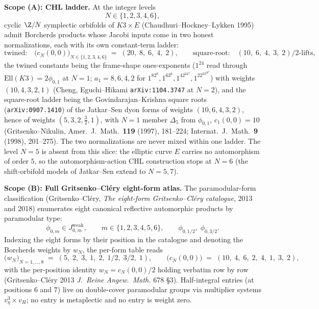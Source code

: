 \textbf{Scope (A): CHL ladder.} At the integer levels
\[
 N \in \{1, 2, 3, 4, 6\},
\]
cyclic $\Z/N$ symplectic orbifolds of $K3 \times E$ (Chaudhuri--Hockney--Lykken 1995) admit Borcherds products whose Jacobi inputs come in two honest normalizations, each with its own constant-term ladder:
\begin{equation}
 \text{twined:}\quad
 \bigl(c_N(0, 0)\bigr)_{N \in \{1, 2, 3, 4, 6\}} \;=\; (20, \; 8, \; 6, \; 4, \; 2),
 \qquad
 \text{square-root:}\quad
 (10, \; 6, \; 4, \; 3, \; 2)/2\text{-lifts},
 \label{eq:cn-zero-chl}
\end{equation}
the twined constants being the frame-shape ones-exponents ($1^{24}$ read through $\mathrm{Ell}(K3) = 2\phi_{0,1}$ at $N = 1$; $a_1 = 8, 6, 4, 2$ for $1^82^8, 1^63^6, 1^42^24^4, 1^22^23^26^2$) with weights $(10, 4, 3, 2, 1)$ (Cheng, Eguchi--Hikami \texttt{arXiv:1104.3747} at $N = 2$), and the square-root ladder being the Govindarajan--Krishna square roots (\texttt{arXiv:0907.1410}) of the Jatkar--Sen dyon forms of weights $(10, 6, 4, 3, 2)$, hence of weights $(5, 3, 2, \tfrac32, 1)$, with $N = 1$ member $\Delta_5$ from $\phi_{0,1}$, $c_1(0,0) = 10$ (Gritsenko--Nikulin, Amer.~J.~Math.~\textbf{119} (1997), 181--224; Internat.~J.~Math.~\textbf{9} (1998), 201--275). The two normalizations are never mixed within one ladder. The level $N = 5$ is absent from this slice: the elliptic curve $E$ carries no automorphism of order $5$, so the automorphism-action CHL construction stops at $N = 6$ (the shift-orbifold models of Jatkar--Sen extend to $N = 5, 7$).

\textbf{Scope (B): Full Gritsenko--Cl\'ery eight-form atlas.} The paramodular-form classification (Gritsenko--Cl\'ery, \emph{The eight-form Gritsenko--Cl\'ery catalogue}, 2013 and 2018) enumerates eight canonical reflective automorphic products by paramodular type:
\[
 \phi_{0, m} \in J_{0, m}^{\mathrm{weak}}, \qquad m \in \{1, 2, 3, 4, 5, 6\}, \qquad \phi_{0, 1/2}, \; \phi_{0, 3/2}.
\]
Indexing the eight forms by their position in the catalogue and denoting the Borcherds weights by $w_N$, the per-form table reads
\begin{equation}
 \bigl(w_N\bigr)_{N = 1, \ldots, 8} \;=\; (5, \; 2, \; 3, \; 1, \; 2, \; 1/2, \; 3/2, \; 1), \qquad \bigl(c_N(0, 0)\bigr) \;=\; (10, \; 4, \; 6, \; 2, \; 4, \; 1, \; 3, \; 2),
 \label{eq:cn-zero-gc-atlas}
\end{equation}
with the per-position identity $w_N = c_N(0, 0)/2$ holding verbatim row by row (Gritsenko--Cl\'ery 2013 \emph{J.\ Reine Angew.\ Math.} 678 \S 3). Half-integral entries (at positions $6$ and $7$) live on double-cover paramodular groups via multiplier systems $v_\eta^3 \times v_H$; no entry is metaplectic and no entry is weight zero.

